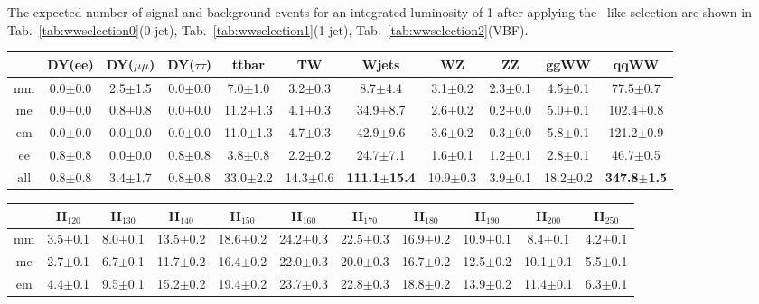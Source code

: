The expected number of signal and background events for an integrated 
luminosity of 1\ifb{} after applying the 
\WW\ like selection are shown in Tab.~\ref{tab:wwselection0}(0-jet), Tab.~\ref{tab:wwselection1}(1-jet), Tab.~\ref{tab:wwselection2}(VBF).

\begin{table}[!ht]
  \begin{center}
 {\small
  \begin{tabular} {|c|c|c|c|c|c|c|c|c|c|c|}
\hline
  & DY(ee) & DY($\mu\mu$) & DY($\tau\tau$) & ttbar & TW & Wjets & WZ & ZZ & ggWW & qqWW \\
  \hline
  \hline
  mm &  0.0$\pm$0.0 &  2.5$\pm$1.5 &  0.0$\pm$0.0 &  7.0$\pm$1.0 &  3.2$\pm$0.3 &  8.7$\pm$4.4 &  3.1$\pm$0.2 &  2.3$\pm$0.1 &  4.5$\pm$0.1 & 77.5$\pm$0.7 \\
  me &  0.0$\pm$0.0 &  0.8$\pm$0.8 &  0.0$\pm$0.0 & 11.2$\pm$1.3 &  4.1$\pm$0.3 & 34.9$\pm$8.7 &  2.6$\pm$0.2 &  0.2$\pm$0.0 &  5.0$\pm$0.1 & 102.4$\pm$0.8 \\
  em &  0.0$\pm$0.0 &  0.0$\pm$0.0 &  0.0$\pm$0.0 & 11.0$\pm$1.3 &  4.7$\pm$0.3 & 42.9$\pm$9.6 &  3.6$\pm$0.2 &  0.3$\pm$0.0 &  5.8$\pm$0.1 & 121.2$\pm$0.9 \\
  ee &  0.8$\pm$0.8 &  0.0$\pm$0.0 &  0.8$\pm$0.8 &  3.8$\pm$0.8 &  2.2$\pm$0.2 & 24.7$\pm$7.1 &  1.6$\pm$0.1 &  1.2$\pm$0.1 &  2.8$\pm$0.1 & 46.7$\pm$0.5 \\
 \hline
 all &  0.8$\pm$0.8 &  3.4$\pm$1.7 &  0.8$\pm$0.8 & 33.0$\pm$2.2 & 14.3$\pm$0.6 & {\bf111.1$\pm$15.4} & 10.9$\pm$0.3 &  3.9$\pm$0.1 & 18.2$\pm$0.2 & {\bf 347.8$\pm$1.5} \\
 \hline
  \end{tabular}
  }
 {\small
  \begin{tabular} {|c|c|c|c|c|c|c|c|c|c|c|}
  \hline
     &   H$_{120}$ &  H$_{130}$ &    H$_{140}$ &   H$_{150}$ &   H$_{160}$ &   H$_{170}$ &   H$_{180}$ &   H$_{190}$ &   H$_{200}$ &   H$_{250}$ \\
  \hline
  \hline
  mm &  3.5$\pm$0.1 &  8.0$\pm$0.1 & 13.5$\pm$0.2 & 18.6$\pm$0.2 & 24.2$\pm$0.3 & 22.5$\pm$0.3 & 16.9$\pm$0.2 & 10.9$\pm$0.1 &  8.4$\pm$0.1 &  4.2$\pm$0.1 \\
  me &  2.7$\pm$0.1 &  6.7$\pm$0.1 & 11.7$\pm$0.2 & 16.4$\pm$0.2 & 22.0$\pm$0.3 & 20.0$\pm$0.3 & 16.7$\pm$0.2 & 12.5$\pm$0.2 & 10.1$\pm$0.1 &  5.5$\pm$0.1 \\
  em &  4.4$\pm$0.1 &  9.5$\pm$0.1 & 15.2$\pm$0.2 & 19.4$\pm$0.2 & 23.7$\pm$0.3 & 22.8$\pm$0.3 & 18.8$\pm$0.2 & 13.9$\pm$0.2 & 11.4$\pm$0.1 &  6.3$\pm$0.1 \\

\end{tabular}}
\end{center}
\end{table}
